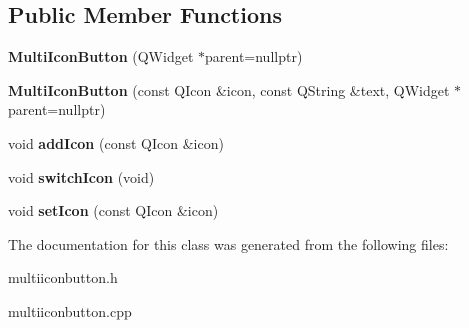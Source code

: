 \subsection*{Public Member Functions}
\begin{DoxyCompactItemize}
\item 
\mbox{\label{classMultiIconButton_af5b082899f26d24b401106b5c7ea7082}} 
{\bfseries Multi\+Icon\+Button} (Q\+Widget $\ast$parent=nullptr)
\item 
\mbox{\label{classMultiIconButton_a52dea076e62b15d50650ca40c7d61a87}} 
{\bfseries Multi\+Icon\+Button} (const Q\+Icon \&icon, const Q\+String \&text, Q\+Widget $\ast$parent=nullptr)
\item 
\mbox{\label{classMultiIconButton_abc95c922c89a0835470342cad3c0ea7f}} 
void {\bfseries add\+Icon} (const Q\+Icon \&icon)
\item 
\mbox{\label{classMultiIconButton_ac2f861763803393327d207ff07892f96}} 
void {\bfseries switch\+Icon} (void)
\item 
\mbox{\label{classMultiIconButton_aeefcca86f41e97b5042f335e75b414d0}} 
void {\bfseries set\+Icon} (const Q\+Icon \&icon)
\end{DoxyCompactItemize}


The documentation for this class was generated from the following files\+:\begin{DoxyCompactItemize}
\item 
multiiconbutton.\+h\item 
multiiconbutton.\+cpp\end{DoxyCompactItemize}
